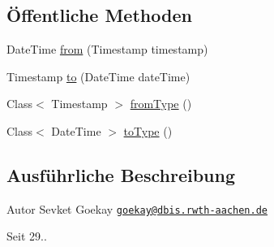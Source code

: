 \subsection*{Öffentliche Methoden}
\begin{DoxyCompactItemize}
\item 
Date\-Time \hyperlink{classde_1_1rwth_1_1idsg_1_1steve_1_1utils_1_1_date_time_converter_a727bb2e6902c1bdce4a0a2b90f1597b1}{from} (Timestamp timestamp)
\item 
Timestamp \hyperlink{classde_1_1rwth_1_1idsg_1_1steve_1_1utils_1_1_date_time_converter_af250ea4f487860a6ec72a7006998f5b5}{to} (Date\-Time date\-Time)
\item 
Class$<$ Timestamp $>$ \hyperlink{classde_1_1rwth_1_1idsg_1_1steve_1_1utils_1_1_date_time_converter_ad7e502df3f70c7171fa3b1ca5a5a77d6}{from\-Type} ()
\item 
Class$<$ Date\-Time $>$ \hyperlink{classde_1_1rwth_1_1idsg_1_1steve_1_1utils_1_1_date_time_converter_a14d461d996f714801a0e2b35cfd61d63}{to\-Type} ()
\end{DoxyCompactItemize}


\subsection{Ausführliche Beschreibung}
\begin{DoxyAuthor}{Autor}
Sevket Goekay \href{mailto:goekay@dbis.rwth-aachen.de}{\tt goekay@dbis.\-rwth-\/aachen.\-de} 
\end{DoxyAuthor}
\begin{DoxySince}{Seit}
29.. 
\end{DoxySince}


